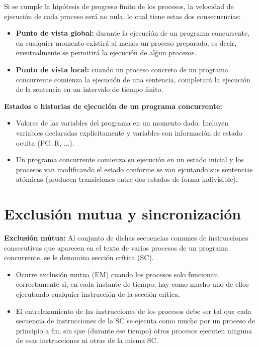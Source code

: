 \documentclass[a4paper,11pt]{article}
\begin{document}
Si se cumple la hipótesis de progreso finito de los procesos, la velocidad de ejecución de cada proceso será no nula, lo cual tiene estas dos consecuencias:

\begin{itemize}
\item \textbf{Punto de vista global:} durante la ejecución de un programa concurrente, en cualquier momento existirá al menos un proceso preparado, es decir, eventualmente se permitirá la ejecución de alǵun procesos.

\item \textbf{Punto de vista local:} cuando un proceso concreto de un programa concurrente comienza la ejecución de una sentencia, completará la ejecución de la sentencia en un intervalo de tiempo finito.
\end{itemize}

\textbf{Estados e historias de ejecución de un programa concurrente:}
\begin{itemize}
\item Valores de las variables del programa en un momento dado. Incluyen variables declaradas explícitamente y variables con información de estado oculta (PC, R, ...).

\item Un programa concurrente comienza su ejecución en un estado inicial y los procesos van modificando el estado conforme se van ejcutando sus sentencias atómicas (producen transiciones entre dos estados de forma indivisible).
\end{itemize}

\section{Exclusión mutua y sincronización}

\textbf{Exclusión mútua:} Al conjunto de dichas secuencias comunes de instrucciones consecutivas que aparecen en el texto de varios procesos de
un programa concurrente, se le denomina sección crítica (SC).

\begin{itemize}
\item Ocurre exclusión mutua (EM) cuando los procesos solo funcionan correctamente si, en cada instante de tiempo, hay como mucho uno de ellos ejecutando cualquier instrucción de la sección crítica.

\item El entrelazamiento de las instrucciones de los procesos debe ser tal que cada secuencia de instrucciones de la SC se ejecuta como mucho por un proceso de principio a fin, sin que (durante ese tiempo) otros procesos ejecuten ninguna de esas instrucciones ni otras de la misma SC.
\end{itemize}
\end{document}
